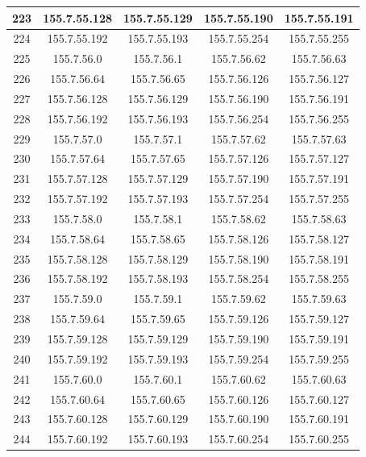 \documentclass[letterpaper,12pt]{article}
\begin{document}
\begin{longtable}{|c|c|c|c|c|}
        223 & 155.7.55.128 & 155.7.55.129 & 155.7.55.190 & 155.7.55.191 \\ \hline
        224 & 155.7.55.192 & 155.7.55.193 & 155.7.55.254 & 155.7.55.255 \\ \hline
        225 & 155.7.56.0 & 155.7.56.1 & 155.7.56.62 & 155.7.56.63 \\ \hline
        226 & 155.7.56.64 & 155.7.56.65 & 155.7.56.126 & 155.7.56.127 \\ \hline
        227 & 155.7.56.128 & 155.7.56.129 & 155.7.56.190 & 155.7.56.191 \\ \hline
        228 & 155.7.56.192 & 155.7.56.193 & 155.7.56.254 & 155.7.56.255 \\ \hline
        229 & 155.7.57.0 & 155.7.57.1 & 155.7.57.62 & 155.7.57.63 \\ \hline
        230 & 155.7.57.64 & 155.7.57.65 & 155.7.57.126 & 155.7.57.127 \\ \hline
        231 & 155.7.57.128 & 155.7.57.129 & 155.7.57.190 & 155.7.57.191 \\ \hline
        232 & 155.7.57.192 & 155.7.57.193 & 155.7.57.254 & 155.7.57.255 \\ \hline
        233 & 155.7.58.0 & 155.7.58.1 & 155.7.58.62 & 155.7.58.63 \\ \hline
        234 & 155.7.58.64 & 155.7.58.65 & 155.7.58.126 & 155.7.58.127 \\ \hline
        235 & 155.7.58.128 & 155.7.58.129 & 155.7.58.190 & 155.7.58.191 \\ \hline
        236 & 155.7.58.192 & 155.7.58.193 & 155.7.58.254 & 155.7.58.255 \\ \hline
        237 & 155.7.59.0 & 155.7.59.1 & 155.7.59.62 & 155.7.59.63 \\ \hline
        238 & 155.7.59.64 & 155.7.59.65 & 155.7.59.126 & 155.7.59.127 \\ \hline
        239 & 155.7.59.128 & 155.7.59.129 & 155.7.59.190 & 155.7.59.191 \\ \hline
        240 & 155.7.59.192 & 155.7.59.193 & 155.7.59.254 & 155.7.59.255 \\ \hline
        241 & 155.7.60.0 & 155.7.60.1 & 155.7.60.62 & 155.7.60.63 \\ \hline
        242 & 155.7.60.64 & 155.7.60.65 & 155.7.60.126 & 155.7.60.127 \\ \hline
        243 & 155.7.60.128 & 155.7.60.129 & 155.7.60.190 & 155.7.60.191 \\ \hline
        244 & 155.7.60.192 & 155.7.60.193 & 155.7.60.254 & 155.7.60.255 \\ \hline

\end{longtable}
\end{document}
